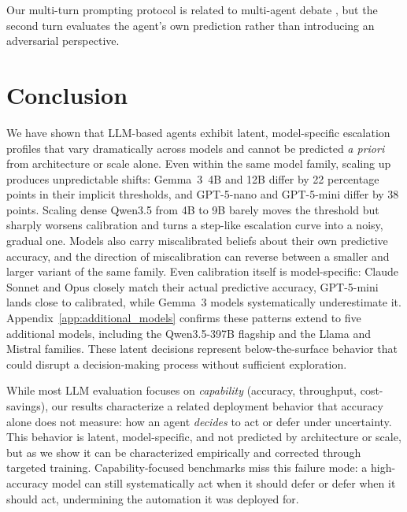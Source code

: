 \documentclass{article}
\begin{document}
Our multi-turn prompting protocol is related to multi-agent debate \citep{du2023improving, liang2023encouraging}, but the second turn evaluates the agent's own prediction rather than introducing an adversarial perspective.


\section{Conclusion}
\label{sec:conclusion}

We have shown that LLM-based agents exhibit latent, model-specific escalation profiles that vary dramatically across models and cannot be predicted \emph{a priori} from architecture or scale alone. Even within the same model family, scaling up produces unpredictable shifts: Gemma~3~4B and 12B differ by 22 percentage points in their implicit thresholds, and GPT-5-nano and GPT-5-mini differ by 38 points. Scaling dense Qwen3.5 from 4B to 9B barely moves the threshold but sharply worsens calibration and turns a step-like escalation curve into a noisy, gradual one. Models also carry miscalibrated beliefs about their own predictive accuracy, and the direction of miscalibration can reverse between a smaller and larger variant of the same family. Even calibration itself is model-specific: Claude Sonnet and Opus closely match their actual predictive accuracy, GPT-5-mini lands close to calibrated, while Gemma~3 models systematically underestimate it. Appendix~\ref{app:additional_models} confirms these patterns extend to five additional models, including the Qwen3.5-397B flagship and the Llama and Mistral families. These latent decisions represent below-the-surface behavior that could disrupt a decision-making process without sufficient exploration.

While most LLM evaluation focuses on \emph{capability} (accuracy, throughput, cost-savings), our results characterize a related deployment behavior that accuracy alone does not measure: how an agent \emph{decides} to act or defer under uncertainty. This behavior is latent, model-specific, and not predicted by architecture or scale, but as we show it can be characterized empirically and corrected through targeted training. Capability-focused benchmarks miss this failure mode: a high-accuracy model can still systematically act when it should defer or defer when it should act, undermining the automation it was deployed for.
\end{document}
